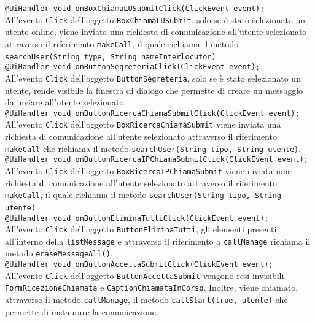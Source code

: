 {\begin{sloppypar}
{{\begin{itemize}
				\texttt{@UiHandler void onBoxChiamaLUSubmitClick(ClickEvent event);}\\
				All'evento \texttt{Click} dell'oggetto \texttt{BoxChiamaLUSubmit}, solo se è stato selezionato un utente online, viene inviata una richiesta di comunicazione all'utente selezionato attraverso il 
				riferimento \texttt{makeCall}, il quale richiama il metodo \texttt{searchUser(String type, String nameInterlocutor)}.\\
				
				\texttt{@UiHandler void onButtonSegreteriaClick(ClickEvent event);}\\
				All'evento \texttt{Click} dell'oggetto \texttt{ButtonSegreteria}, solo se è stato selezionato un utente, rende visibile la finestra di dialogo che permette di creare un messaggio da inviare all'utente selezionato.\\

				\texttt{@UiHandler void onButtonRicercaChiamaSubmitClick(ClickEvent event);}\\
				All'evento \texttt{Click} dell'oggetto \texttt{BoxRicercaChiamaSubmit} viene inviata una 
				richiesta di comunicazione all'utente selezionato attraverso il riferimento \texttt{makeCall} che richiama 
				il metodo \texttt{searchUser(String tipo, String utente)}.\\

				\texttt{@UiHandler void onButtonRicercaIPChiamaSubmitClick(ClickEvent event);}\\
				All'evento \texttt{Click} dell'oggetto \texttt{BoxRicercaIPChiamaSubmit} viene inviata 
				una richiesta di comunicazione all'utente selezionato attraverso il riferimento \texttt{makeCall}, il quale 
				richiama il metodo \texttt{searchUser(String tipo, String utente)}.\\
				
				\texttt{@UiHandler void onButtonEliminaTuttiClick(ClickEvent event);}\\
				All'evento \texttt{Click} dell'oggetto \texttt{ButtonEliminaTutti}, gli elementi presenti all'interno della \texttt{listMessage} e attraverso il riferimento a \texttt{callManage} richiama il metodo \texttt{eraseMessageAll()}.\\

				\texttt{@UiHandler void onButtonAccettaSubmitClick(ClickEvent event);}\\
				All'evento \texttt{Click} dell'oggetto \texttt{ButtonAccettaSubmit} vengono resi invisibili \texttt{FormRicezioneChiamata} 
				e \texttt{CaptionChiamataInCorso}. Inoltre, viene chiamato, attraverso il metodo \texttt{callManage}, il 
				metodo \texttt{callStart(true, utente)} che permette di instaurare la comunicazione.\\


\end{itemize}}}
\end{sloppypar}}
